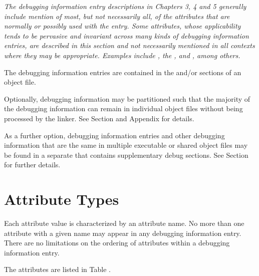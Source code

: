 \textit{The debugging information entry descriptions in
Chapters 3, 4 and 5 generally include mention of
most, but not necessarily all, of the attributes
that are normally or possibly used with the entry.
Some attributes, whose applicability tends to be
pervasive and invariant across many kinds of
debugging information entries, are described in
this section and not necessarily mentioned in all
contexts where they may be appropriate.
Examples include
\DWATartificial,
the , and
\DWATdescription,
among others.}

The debugging information entries are contained in the
\dotdebuginfo{} and/or \dotdebuginfodwo{} sections of an object file.

Optionally, debugging information may be partitioned such
that the majority of the debugging information can remain in
individual object files without being processed by the
linker. See Section  and
Appendix  for details.

As a further option, debugging information entries and other debugging
information that are the same in multiple executable or shared object files
may be found in a separate  that
contains supplementary debug sections.
See Section  for
further details.

\section{Attribute Types}
\label{chap:attributetypes}
Each attribute value is characterized by an attribute name.
No more than one attribute with a given name may appear in any
debugging information entry.
There are no limitations on the
ordering of attributes within a debugging information entry.

The attributes are listed in Table .


